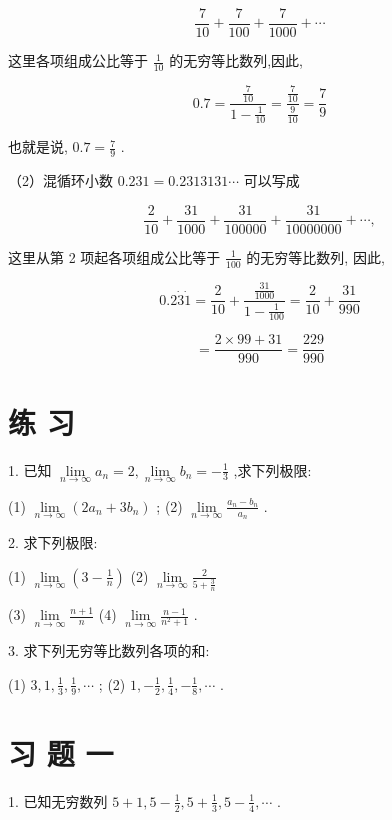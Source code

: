 \documentclass[10pt]{article}
\begin{document}
\[
\frac{7}{10} + \frac{7}{100} + \frac{7}{1000} + \cdots
\]

这里各项组成公比等于 \(\frac{1}{10}\) 的无穷等比数列,因此,

\[
{0.7} = \frac{\frac{7}{10}}{1 - \frac{1}{10}} = \frac{\frac{7}{10}}{\frac{9}{10}} = \frac{7}{9}
\]

也就是说, \({0.7} = \frac{7}{9}\) .

（2）混循环小数 \({0.231} = {0.2313131}\cdots\) 可以写成

\[
\frac{2}{10} + \frac{31}{1000} + \frac{31}{100000} + \frac{31}{10000000} + \cdots ,
\]

这里从第 2 项起各项组成公比等于 \(\frac{1}{100}\) 的无穷等比数列, 因此,

\[
{0.2}\dot{3}\dot{1} = \frac{2}{10} + \frac{\frac{31}{1000}}{1 - \frac{1}{100}} = \frac{2}{10} + \frac{31}{990}
\]

\[
= \frac{2 \times {99} + {31}}{990} = \frac{229}{990}
\]

\section*{练 习}

1. 已知 \(\mathop{\lim }\limits_{{n \rightarrow \infty }}{a}_{n} = 2,\mathop{\lim }\limits_{{n \rightarrow \infty }}{b}_{n} = - \frac{1}{3}\) ,求下列极限:

(1) \(\mathop{\lim }\limits_{{n \rightarrow \infty }}\left( {2{a}_{n} + 3{b}_{n}}\right)\) ; (2) \(\mathop{\lim }\limits_{{n \rightarrow \infty }}\frac{{a}_{n} - {b}_{n}}{{a}_{n}}\) .

2. 求下列极限:

(1) \(\mathop{\lim }\limits_{{n \rightarrow \infty }}\left( {3 - \frac{1}{n}}\right)\) (2) \(\mathop{\lim }\limits_{{n \rightarrow \infty }}\frac{2}{5 + \frac{3}{n}}\)

(3) \(\mathop{\lim }\limits_{{n \rightarrow \infty }}\frac{n + 1}{n}\) (4) \(\mathop{\lim }\limits_{{n \rightarrow \infty }}\frac{n - 1}{{n}^{2} + 1}\) .

3. 求下列无穷等比数列各项的和:

(1) \(3,1,\frac{1}{3},\frac{1}{9},\cdots\) ; (2) \(1, - \frac{1}{2},\frac{1}{4}, - \frac{1}{8},\cdots\) .

\section*{习 题 一}

1. 已知无穷数列 \(5 + 1,5 - \frac{1}{2},5 + \frac{1}{3},5 - \frac{1}{4},\cdots\) .
\end{document}
